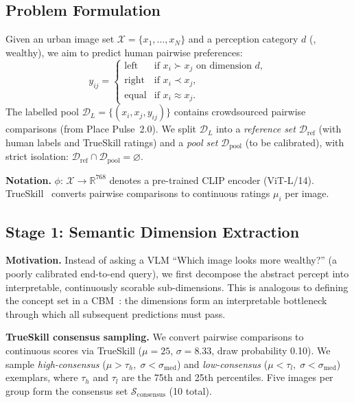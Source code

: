 \documentclass[runningheads]{llncs}
\begin{document}
\subsection{Problem Formulation}
\label{sec:formulation}

Given an urban image set $\mathcal{X}{=}\{x_1,\ldots,x_N\}$ and a perception category $d$ (\eg, wealthy), we aim to predict human pairwise preferences:
\begin{equation}
y_{ij} =
\begin{cases}
\text{left}  & \text{if } x_i \succ x_j \text{ on dimension } d,\\
\text{right} & \text{if } x_i \prec x_j,\\
\text{equal} & \text{if } x_i \approx x_j.
\end{cases}
\label{eq:pairwise}
\end{equation}
The labelled pool $\mathcal{D}_{L}{=}\{(x_i,x_j,y_{ij})\}$ contains crowdsourced pairwise comparisons (from Place Pulse~2.0).
We split $\mathcal{D}_{L}$ into a \emph{reference set} $\mathcal{D}_{\mathrm{ref}}$ (with human labels and TrueSkill ratings) and a \emph{pool set} $\mathcal{D}_{\mathrm{pool}}$ (to be calibrated), with strict isolation: $\mathcal{D}_{\mathrm{ref}} \cap \mathcal{D}_{\mathrm{pool}} = \varnothing$.

\noindent\textbf{Notation.}
$\phi{:}\,\mathcal{X}{\to}\mathbb{R}^{768}$ denotes a pre-trained CLIP encoder (ViT-L/14).
TrueSkill~\cite{herbrich2006trueskill} converts pairwise comparisons to continuous ratings $\mu_i$ per image.

\subsection{Stage 1: Semantic Dimension Extraction}
\label{sec:stage1}

\noindent\textbf{Motivation.}
Instead of asking a VLM ``Which image looks more wealthy?'' (a poorly calibrated end-to-end query), we first decompose the abstract percept into interpretable, continuously scorable sub-dimensions.
This is analogous to defining the concept set in a CBM~\cite{koh2020concept}: the dimensions form an interpretable bottleneck through which all subsequent predictions must pass.

\smallskip\noindent\textbf{TrueSkill consensus sampling.}
We convert pairwise comparisons to continuous scores via TrueSkill ($\mu{=}25$, $\sigma{=}8.33$, draw probability 0.10).
We sample \emph{high-consensus} ($\mu{>}\tau_{h},\;\sigma{<}\sigma_{\mathrm{med}}$) and \emph{low-consensus} ($\mu{<}\tau_{l},\;\sigma{<}\sigma_{\mathrm{med}}$) exemplars, where $\tau_{h}$ and $\tau_{l}$ are the 75th and 25th percentiles.
Five images per group form the consensus set $\mathcal{S}_{\mathrm{consensus}}$ (10 total).
\end{document}
